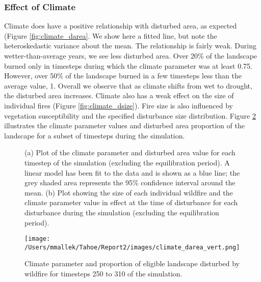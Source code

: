 \subsubsection{Effect of Climate} Climate does have a positive relationship with disturbed area, as expected (Figure \ref{fig:climate_darea}. We show here a fitted line, but note the heteroskedastic variance about the mean. The relationship is fairly weak. During wetter-than-average years, we see less disturbed area. Over 20\% of the landscape burned only in timesteps during which the climate parameter was at least 0.75. However, over 50\% of the landscape burned in a few timesteps less than the average value, 1. Overall we observe that as climate shifts from wet to drought, the disturbed area increases. Climate also has a weak effect on the size of individual fires (Figure \ref{fig:climate_dsize}). Fire size is also influenced by vegetation susceptibility and the specified disturbance size distribution. Figure \ref{fig:compare_clim_darea} illustrates the climate parameter values and disturbed area proportion of the landscape for a subset of timesteps during the simulation.

\begin{figure}[!htbp]
  \centering
  \caption{(a) Plot of the climate parameter and disturbed area value for each timestep of the simulation (excluding the  equilibration period). A linear model has been fit to the data and is shown as a blue line; the grey shaded area represents  the 95\% confidence interval around the mean. (b) Plot showing the size of each individual wildfire and the climate parameter value in effect at the time of disturbance for each disturbance during the simulation (excluding the equilibration period).}
  \label{fig:climate_disturbance}
\end{figure}

\begin{figure}[!htbp]
\centering
\texttt{[image: /Users/mmallek/Tahoe/Report2/images/climate\_darea\_vert.png]}
\caption{Climate parameter and proportion of eligible landscape disturbed by wildfire for timesteps 250 to 310 of the simulation.}
\label{fig:compare_clim_darea}
\end{figure}

